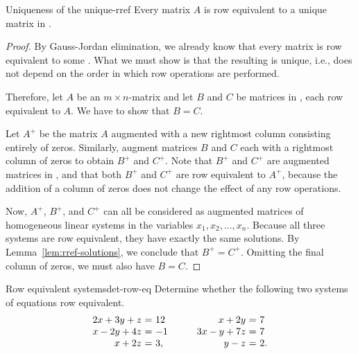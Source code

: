 \begin{theorem}{Uniqueness of the {\rref}}{unique-rref}
  Every matrix $A$ is row equivalent to a unique matrix in {\rref}.
\end{theorem}

\begin{proof}
  By Gauss-Jordan elimination, we already know that every matrix is
  row equivalent to some {\rref}. What we must show is that the
  resulting {\rref} is unique, i.e., does not depend on the order in
  which row operations are performed.
  
  Therefore, let $A$ be an $m \times n$-matrix and let $B$ and $C$ be
  matrices in {\rref}, each row equivalent to $A$. We have to show
  that $B=C$.

  Let $A^{+}$ be the matrix $A$ augmented with a new rightmost column
  consisting entirely of zeros. Similarly, augment matrices $B$ and
  $C$ each with a rightmost column of zeros to obtain $B^{+}$ and
  $C^{+}$. Note that $B^{+}$ and $C^{+}$ are augmented matrices in
  {\rref}, and that both $B^{+}$ and $C^{+}$ are row equivalent to
  $A^{+}$, because the addition of a column of zeros does not change
  the effect of any row operations.

  Now, $A^{+}$, $B^{+}$, and $C^{+}$ can all be considered as
  augmented matrices of homogeneous linear systems in the variables
  $x_1, x_2,\ldots, x_n$. Because all three systems are row
  equivalent, they have exactly the same solutions. By
  Lemma~\ref{lem:rref-solutions}, we conclude that $B^{+}=C^{+}$.
  Omitting the final column of zeros, we must also have $B=C$.
\end{proof}

\begin{example}{Row equivalent systems}{det-row-eq}
  Determine whether the following two systems of equations row equivalent.
  \begin{equation*}
    \begin{array}{r@{~}c@{~}l}
      2x + 3y + z &=& 12 \\
      x - 2y + 4z &=& -1 \\
      x + 2z &=& 3,
    \end{array}
    \quad\quad
    \begin{array}{r@{~}c@{~}l}
      x + 2y &=& 7 \\
      3x - y + 7z &=& 7 \\
      y - z &=& 2.
    \end{array}
  \end{equation*}
\end{example}

